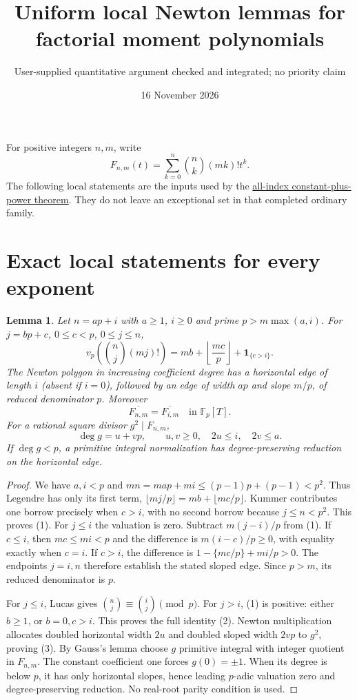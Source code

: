 \documentclass[11pt]{article}
\title{Uniform local Newton lemmas for factorial moment polynomials}
\author{User-supplied quantitative argument checked and integrated; no priority claim}
\date{16 November 2026}
\newtheorem{lemma}[theorem]{Lemma}
\newcommand{\F}{\mathbb F}
\begin{document}
\maketitle
For positive integers $n,m$, write
\[
 F_{n,m}(t)=\sum_{k=0}^n\binom nk(mk)!t^k.
\]
The following local statements are the inputs used by the
\href{ALL_UNIVARIATE_TWO_TERM_SFC.tex}{all-index constant-plus-power theorem}.
They do not leave an exceptional set in that completed ordinary family.

\section{Exact local statements for every exponent}
\begin{lemma}\label{lem:shift}
Let $n=ap+i$ with $a\ge1$, $i\ge0$ and prime $p>m\max(a,i)$.
For $j=bp+c$, $0\le c<p$, $0\le j\le n$,
\[
 v_p\!\left(\binom nj(mj)!\right)
 =mb+\left\lfloor\frac{mc}{p}\right\rfloor
       +\mathbf1_{\{c>i\}}. \tag{1}
\]
The Newton polygon in increasing coefficient degree has a horizontal edge
of length $i$ (absent if $i=0$), followed by an edge of width $ap$ and
slope $m/p$, of reduced denominator $p$. Moreover
\[
 \overline{F_{n,m}}=\overline{F_{i,m}}\quad\text{in }\F_p[T]. \tag{2}
\]
For a rational square divisor $g^2\mid F_{n,m}$,
\[
 \deg g=u+vp,\qquad u,v\ge0,\quad2u\le i,\quad2v\le a. \tag{3}
\]
If $\deg g<p$, a primitive integral normalization has degree-preserving
reduction on the horizontal edge.
\end{lemma}
\begin{proof}
We have $a,i<p$ and
$mn=map+mi\le(p-1)p+(p-1)<p^2$. Thus Legendre has only its first term,
$\lfloor mj/p\rfloor=mb+\lfloor mc/p\rfloor$.
Kummer contributes one borrow precisely when $c>i$, with no second borrow
because $j\le n<p^2$. This proves (1).
For $j\le i$ the valuation is zero. Subtract $m(j-i)/p$ from (1).
If $c\le i$, then $mc\le mi<p$ and the difference is
$m(i-c)/p\ge0$, with equality exactly when $c=i$.
If $c>i$, the difference is
$1-\{mc/p\}+mi/p>0$.
The endpoints $j=i,n$ therefore establish the stated sloped edge.
Since $p>m$, its reduced denominator is $p$.

For $j\le i$, Lucas gives $\binom nj\equiv\binom ij\pmod p$.
For $j>i$, (1) is positive: either $b\ge1$, or $b=0,c>i$.
This proves the full identity (2).
Newton multiplication allocates doubled horizontal width $2u$ and doubled
sloped width $2vp$ to $g^2$, proving (3).
By Gauss's lemma choose $g$ primitive integral with integer quotient in
$F_{n,m}$. The constant coefficient one forces $g(0)=\pm1$.
When its degree is below $p$, it has only horizontal slopes, hence leading
$p$-adic valuation zero and degree-preserving reduction.
No real-root parity condition is used.
\end{proof}
\end{document}

